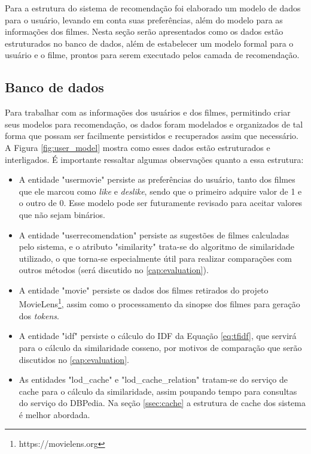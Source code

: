 Para a estrutura do sistema de recomendação foi elaborado um modelo de dados para o usuário, levando em conta suas preferências, além do modelo para as informações dos filmes. Nesta seção serão apresentados como os dados estão estruturados no banco de dados, além de estabelecer um modelo formal para o usuário e o filme, prontos para serem executado pelos camada de recomendação.

\subsection{Banco de dados}

Para trabalhar com as informações dos usuários e dos filmes, permitindo criar seus modelos para recomendação, os dados foram modelados e organizados de tal forma que possam ser facilmente persistidos e recuperados assim que necessário. A Figura \ref{fig:user_model} mostra como esses dados estão estruturados e interligados. É importante ressaltar algumas observações quanto a essa estrutura:

\begin{itemize}
	\item{A entidade "user\textunderscore movie" persiste as preferências do usuário, tanto dos filmes que ele marcou como \textit{like} e \textit{deslike}, sendo que o primeiro adquire valor de 1 e o outro de 0. Esse modelo pode ser futuramente revisado para aceitar valores que não sejam binários.}
	
	\item{A entidade "user\textunderscore recomendation" persiste as sugestões de filmes calculadas pelo sistema, e o atributo "similarity" trata-se do algoritmo de similaridade utilizado, o que torna-se especialmente útil para realizar comparações com outros métodos (será discutido no \ref{cap:evaluation}).}
	
	\item{A entidade "movie" persiste os dados dos filmes retirados do projeto MovieLens\footnote{https://movielens.org}, assim como o processamento da sinopse dos filmes para geração dos \textit{tokens}.}
	
	\item{A entidade "idf" persiste o cálculo do \ac{IDF} da Equação \ref{eq:tfidf}, que servirá para o cálculo da similaridade cosseno, por motivos de comparação que serão discutidos no \ref{cap:evaluation}.}
	
	\item{As entidades "lod\_cache" e "lod\_cache\_relation" tratam-se do serviço de cache para o cálculo da similaridade, assim poupando tempo para consultas do serviço do DBPedia. Na seção \ref{ssec:cache} a estrutura de cache dos sistema é melhor abordada.}
\end{itemize}

